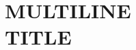 \documentclass[../Dissertation]{subfiles}
\begin{document}
    \chapter[\uppercase{Multiline Title}]{\uppercase{Multiline
    \protect\\ Title}}\label{chp:2}
    
    \lipsum[1] %
    
    
    
    
    
    
    
    
    
    
    \printbibliography[segment=\therefsegment,heading=references]
    
\end{document}
